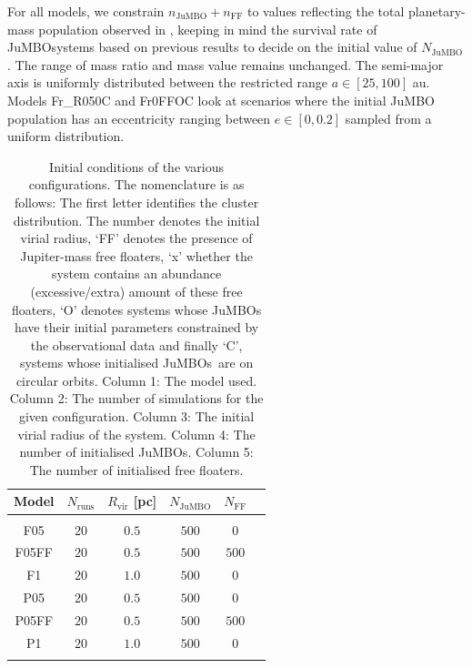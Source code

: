 \documentclass[submission,phys]{lib/SciPost}
\newcommand{\jumbo}{\mbox{JuMBO}}
\newcommand{\jumbos}{\mbox{JuMBOs}}
\begin{document}
For all models, we constrain $n_{\mathrm{\jumbo}} + n_{\mathrm{FF}}$
to values reflecting the total planetary-mass population observed in
\cite{2023arXiv231001231P}, keeping in mind the survival rate of
\jumbo systems based on previous results to decide on the initial
value of $N_{\mathrm{\jumbo}}$. The range of mass ratio and mass value
remains unchanged. The semi-major axis is uniformly distributed
between the restricted range $a\in[25,100]$ au.  Models Fr\_R050C and
Fr0FFOC look at scenarios where the initial \jumbo\, population has an
eccentricity ranging between $e\in[0,0.2]$ sampled from a uniform
distribution.
 
\begin{table}
  \caption{Initial conditions of the various configurations. The
    nomenclature is as follows: The first letter identifies the
    cluster distribution. The number denotes the initial virial
    radius, `FF' denotes the presence of Jupiter-mass free floaters,
    `x' whether the system contains an abundance (excessive/extra)
    amount of these free floaters, `O' denotes systems whose \jumbos
    have their initial parameters constrained by the observational
    data and finally `C', systems whose initialised \jumbos\, are on
    circular orbits. Column 1: The model used. Column 2: The number of
    simulations for the given configuration. Column 3: The initial
    virial radius of the system. Column 4: The number of initialised
    \jumbos. Column 5: The number of initialised free floaters.}
        \label{Tab:SF_FF_Params}
        \centering 
        \begin{tabular}{c c c c c c}
        \hline\hline
        Model & $N_{\mathrm{runs}}$ & $R_{\mathrm{vir}}$ [pc] & $N_{\mathrm{\jumbo}}$ & $N_{\mathrm{FF}}$\\
        \hline \vspace{-0.75em}\\ 
           F05     & $20$ & $0.5$ & $500$ & $0$ \\
           F05FF   & $20$ & $0.5$ & $500$ & $500$ \\
           F1      & $20$ & $1.0$ & $500$ & $0$ \\
           P05     & $20$ & $0.5$ & $500$ & $0$ \\
           P05FF   & $20$ & $0.5$ & $500$ & $500$ \\
           P1      & $20$ & $1.0$ & $500$ & $0$ \\
           \hline
           \hline \vspace{-0.75em}\\

\end{tabular}
\end{table}
\end{document}
